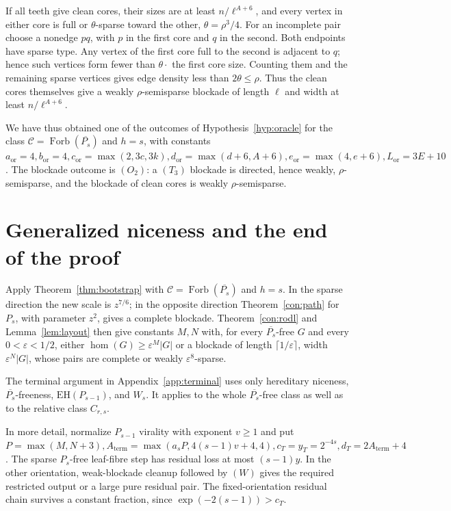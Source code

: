 \documentclass[11pt,a4paper]{article}
\theoremstyle{definition}
\theoremstyle{remark}
\numberwithin{equation}{section}
\DeclareMathOperator{\Forb}{Forb}
\newcommand{\EH}{\mathrm{EH}}
\begin{document}
If all teeth give clean cores, their sizes are at least \(n/\ell^{A+6}\), and every vertex in either core is full or \(\theta\)-sparse toward the other, \(\theta=\rho^{3}/4\). For an incomplete pair choose a nonedge \(pq\), with \(p\) in the first core and \(q\) in the second. Both endpoints have sparse type. Any vertex of the first core full to the second is adjacent to \(q\); hence such vertices form fewer than \(\theta \cdot \) the first core size. Counting them and the remaining sparse vertices gives edge density less than \(2\theta\le\allowbreak \rho\). Thus the clean cores themselves give a weakly \(\rho\)-semisparse blockade of length \(\ell\) and width at least \(n/\ell^{A+6}\).

We have thus obtained one of the outcomes of Hypothesis~\ref{hyp:oracle} for the class \(\mathcal C=\Forb(\overline{P_s})\) and \(h=s\), with constants \(a_{\mathrm{or}}=4,\allowbreak  b_{\mathrm{or}}=4,\allowbreak  c_{\mathrm{or}}=\max (2,\allowbreak 3c,\allowbreak 3k),\allowbreak  d_{\mathrm{or}}=\max (d+6,\allowbreak A+6),\allowbreak  e_{\mathrm{or}}=\max (4,\allowbreak e+6),\allowbreak  L_{\mathrm{or}}=3E+10\). The blockade outcome is \((O_{2})\): a \((T_{3})\) blockade is directed, hence weakly, \(\rho\)-semisparse, and the blockade of clean cores is weakly \(\rho\)-semisparse.


\section{Generalized niceness and the end of the proof}\label{sec:conclusion}
Apply Theorem~\ref{thm:bootstrap} with \(\mathcal C=\Forb(\overline{P_s})\) and \(h=s\). In the sparse direction the new scale is \(z^{7/6}\); in the opposite direction Theorem~\ref{con:path} for \(P_{s}\), with parameter \(z^{2}\), gives a complete blockade. Theorem~\ref{con:rodl} and Lemma~\ref{lem:layout} then give constants \(M,\allowbreak N\) with, for every \(\overline{P_{s}}\)-free \(G\) and every \(0<\varepsilon<1/2\), either \(\hom (G)\ge\allowbreak \varepsilon^{M}|G|\) or a blockade of length \(\lceil 1/\varepsilon\rceil\), width \(\varepsilon^{N}|G|\), whose pairs are complete or weakly \(\varepsilon^{8}\)-sparse.

The terminal argument in Appendix~\ref{app:terminal} uses only hereditary niceness, \(\overline{P_s}\)-freeness, \(\EH(P_{s-1})\), and \(W_s\). It applies to the whole \(\overline{P_s}\)-free class as well as to the relative class \(C_{r,s}\).

In more detail, normalize \(P_{s-1}\) virality with exponent \(v\ge\allowbreak 1\) and put \(P=\max (M,\allowbreak N+3),\allowbreak  A_{\mathrm{term}}=\max (a_{s} P,\allowbreak 4(s-1)v+4,\allowbreak 4),\allowbreak  c_{T}=y_{T}=2^{-4s},\allowbreak  d_{T}=2A_{\mathrm{term}}+4\). The sparse \(P_{s}\)-free leaf-fibre step has residual loss at most \((s-1)y\). In the other orientation, weak-blockade cleanup followed by \((W)\) gives the required restricted output or a large pure residual pair. The fixed-orientation residual chain survives a constant fraction, since \(\exp (-2(s-1))>c_{T}\).
\end{document}
